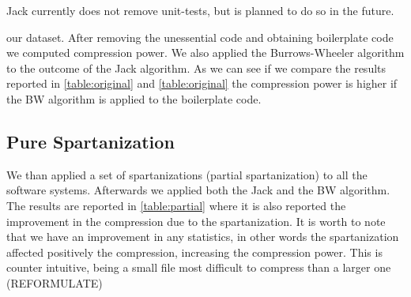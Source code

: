 Jack currently does not remove unit-tests, but is planned to do so in the future.

our dataset. After removing the unessential code and obtaining boilerplate
code we computed compression power. We also applied the Burrows-Wheeler
algorithm to the outcome of the Jack algorithm. As we can see if we compare
the results reported in \cref{table:original} and \cref{table:original} the
compression power is higher if the BW algorithm is applied to the boilerplate
code.

\begin{table}
  \caption{The results of the compression using the Jack algorithm alone and both Jack and
  Burrows-Wheeler algorithms combined}
  \label{table:original}
  \par\vspace{10pt plus 6pt minus 4pt}
  \centering
\end{table}


\subsection{Pure Spartanization}

We than applied a set of spartanizations (partial spartanization) to all the
software systems. Afterwards we applied both the Jack and the BW algorithm.
The results are reported in \cref{table:partial} where it is also
reported the improvement in the compression due to the spartanization. It is
worth to note that we have an improvement in any statistics, in other words the
spartanization affected positively the compression, increasing the compression
power. This is counter intuitive, being a small file most difficult to
compress than a larger one (REFORMULATE)

